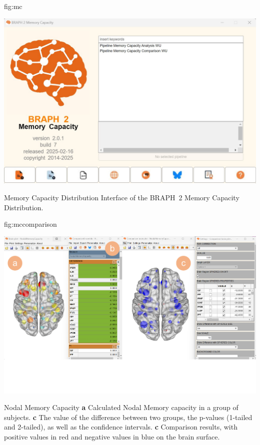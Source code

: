 \documentclass{tufte-handout}
\begin{document}
{fig:mc}
{\centerline{\includegraphics{fig04.jpg}}}
{Memory Capacity Distribution}
{
	Interface of the BRAPH~2 Memory Capacity Distribution.
}

{fig:mccomparison}
{\centerline{\includegraphics{fig05.jpg}}}
{Nodal Memory Capacity}
{
	{\bf a} Calculated Nodal Memory capacity in a group of subjects.
	{\bf c} The value of the difference between two groups, the p-values (1-tailed and 2-tailed), as well as the confidence intervals. 
	{\bf c} Comparison results, with positive values in red and negative values in blue on the brain surface.
}

\end{document}
